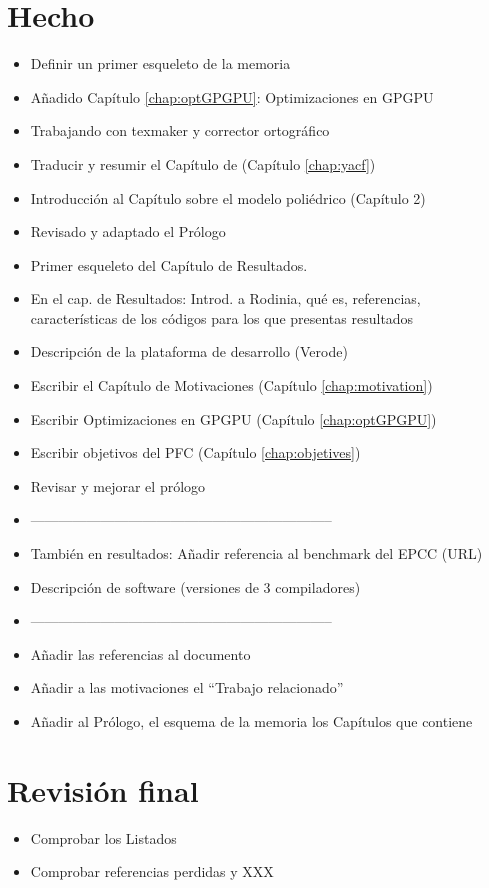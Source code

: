 \section{Hecho}
\begin{itemize}
\item Definir un primer esqueleto de la memoria
\item Añadido Capítulo \ref{chap:optGPGPU}: Optimizaciones en GPGPU
\item Trabajando con texmaker y corrector ortográfico
\item Traducir y resumir el Capítulo de \yacf{} (Capítulo \ref{chap:yacf})
\item Introducción al Capítulo sobre el modelo poliédrico (Capítulo 2)
\item Revisado y adaptado el Prólogo
\item Primer esqueleto del Capítulo de Resultados.
\item En el cap. de Resultados: Introd. a Rodinia, qué es, referencias, características de los códigos para los que presentas resultados
\item Descripción de la plataforma de desarrollo (Verode)
\item Escribir el Capítulo de Motivaciones (Capítulo \ref{chap:motivation})
\item Escribir Optimizaciones en GPGPU (Capítulo \ref{chap:optGPGPU})
\item Escribir objetivos del \ac{PFC} (Capítulo \ref{chap:objetives})
\item Revisar y mejorar el prólogo
\item -----------------------------------------------------------------
\item También en resultados: Añadir referencia al benchmark del EPCC (URL)
\item Descripción de software (versiones de 3 compiladores)
\item -----------------------------------------------------------------
\item Añadir las referencias al documento
\item Añadir a las motivaciones el ``Trabajo relacionado''
\item Añadir al Prólogo, el esquema de la memoria los Capítulos que contiene
\end{itemize}

\section{Revisión final}
\begin{itemize}
\item Comprobar los Listados
\item Comprobar referencias perdidas y XXX 
\end{itemize}
